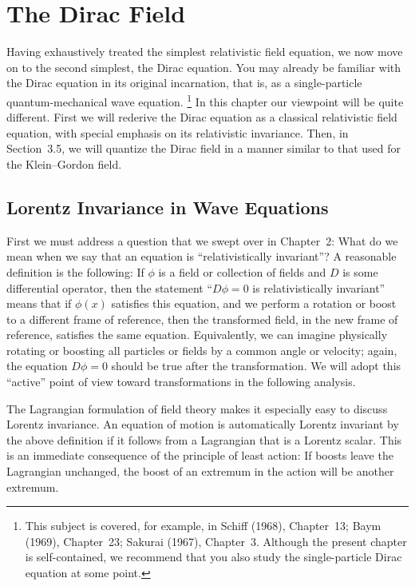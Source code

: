 \chapter{The Dirac Field}

Having exhaustively treated the simplest relativistic field equation, we now
move on to the second simplest, the Dirac equation.  You may already be
familiar with the Dirac equation in its original incarnation, that is, as a
single-particle quantum-mechanical wave equation.%
\footnote{This subject is covered, for example, in Schiff (1968), Chapter~13;
Baym (1969), Chapter~23; Sakurai (1967), Chapter~3.  Although the present
chapter is self-contained, we recommend that you also study the
single-particle Dirac equation at some point.}  In this chapter our viewpoint
will be quite different.  First we will rederive the Dirac equation as a
classical relativistic field equation, with special emphasis on its
relativistic invariance.  Then, in Section~3.5, we will quantize the Dirac
field in a manner similar to that used for the Klein--Gordon field.

\section{Lorentz Invariance in Wave Equations}

First we must address a question that we swept over in Chapter~2: What do we
mean when we say that an equation is ``relativistically invariant''?  A
reasonable definition is the following: If $\phi$ is a field or collection of
fields and $D$ is some differential operator, then the statement ``$D\phi =
0$ is relativistically invariant'' means that if $\phi(x)$ satisfies this
equation, and we perform a rotation or boost to a different frame of
reference, then the transformed field, in the new frame of reference,
satisfies the same equation.  Equivalently, we can imagine physically
rotating or boosting all particles or fields by a common angle or velocity;
again, the equation $D\phi = 0$ should be true after the transformation.  We
will adopt this ``active'' point of view toward transformations in the
following analysis.

The Lagrangian formulation of field theory makes it especially easy to
discuss Lorentz invariance.  An equation of motion is automatically Lorentz
invariant by the above definition if it follows from a Lagrangian that is a
Lorentz scalar.  This is an immediate consequence of the principle of least
action: If boosts leave the Lagrangian unchanged, the boost of an extremum
in the action will be another extremum.

